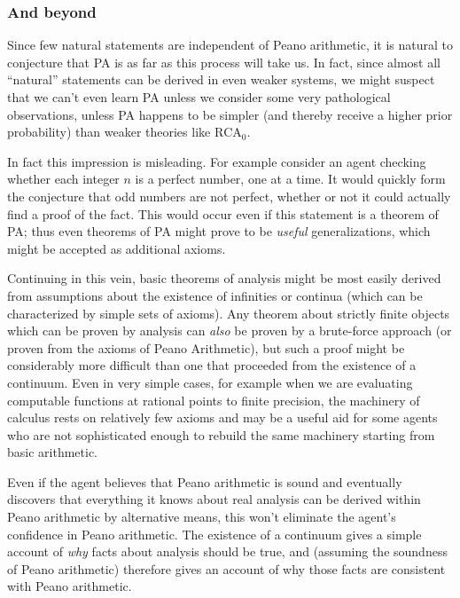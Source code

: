 \documentclass[12pt]{article}
\theoremstyle{definition}
\begin{document}
\subsubsection{And beyond}

Since few natural statements are independent of Peano arithmetic,
it is natural to conjecture that PA is as far as this process will take us.
In fact, since almost all ``natural'' statements
can be derived in even weaker systems, %
we might suspect that we can't even learn PA
unless we consider some very pathological observations,
unless PA happens to be simpler (and thereby receive a higher prior probability)
than weaker theories like $\text{RCA}_0$.

In fact this impression is misleading.
For example
consider an agent checking whether each integer $n$ is a perfect number,
one at a time.
It would quickly form the conjecture that odd numbers are not perfect,
whether or not it could actually find a proof of the fact.
This would occur even if this statement is a theorem of PA;
thus even theorems of PA might prove to be \emph{useful} generalizations,
which might be accepted as additional axioms.

Continuing in this vein, basic theorems of analysis might be most easily derived
from assumptions about the existence of infinities or continua
(which can be characterized by simple sets of axioms).
Any theorem about strictly finite objects which can be proven
by analysis can \emph{also} be proven by a brute-force approach
(or proven from the axioms of Peano Arithmetic),
but such a proof might be considerably more difficult
than one that proceeded from the existence of a continuum.
Even in very simple cases, for example when we are evaluating
computable functions at rational points to finite precision,
the machinery of calculus rests on relatively few axioms and
may be a useful aid for some agents who are not sophisticated enough
to rebuild the same machinery starting from basic arithmetic.

Even if the agent believes that Peano arithmetic is sound
and eventually discovers that everything it knows about real analysis can be derived
within Peano arithmetic by alternative means,
this won't eliminate the agent's confidence in Peano arithmetic.
The existence of a continuum gives a simple account of \emph{why}
facts about analysis should be true, and (assuming the soundness of Peano arithmetic)
therefore gives an account of why those facts are consistent with Peano arithmetic.
\end{document}
